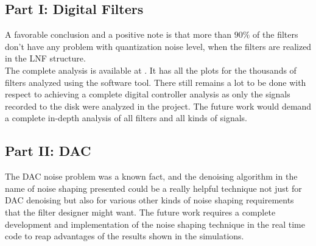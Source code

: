 \documentclass[a4paper,12pt]{article}
\begin{document}
 \subsection{Part I: Digital Filters} A favorable conclusion and a positive note is that more than $90\%$ of the filters don't have any problem with quantization noise level, when the filters are realized in the LNF structure.\\
	The complete analysis is available at \cite{drive}. It has all the plots for the thousands of filters analyzed using the software tool.
There still remains a lot to be done with respect to achieving a complete digital controller analysis as only the signals recorded to the disk were analyzed in the project. The future work would demand a complete in-depth analysis of all filters and all kinds of signals. 
	\subsection{Part II: DAC} The DAC noise problem was a known fact, and the denoising algorithm in the name of noise shaping presented could be a really helpful technique not just for DAC denoising but also for various other kinds of noise shaping requirements that the filter designer might want. The future work requires a complete development and implementation of the noise shaping technique in the real time code to reap advantages of the results shown in the simulations. 
  	
\end{document}

